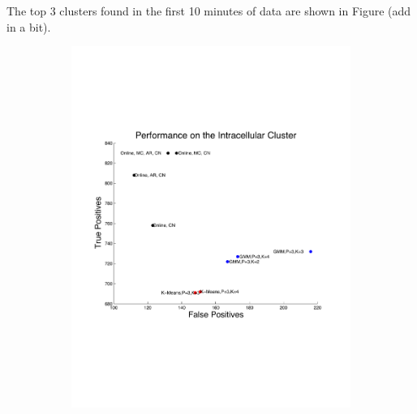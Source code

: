 \documentclass{article} %
\begin{document}
 The top 3 clusters found in the first 10 minutes of data are shown in Figure (add in a bit).


\begin{center}
\begin{figure}
\begin{subfigure}[b]{.5\textwidth}
\centering
\includegraphics[width=\textwidth]{../figs/truefalsepositive}
\caption{}
\label{hc1res}
\end{subfigure}
\begin{subfigure}[b]{.5\textwidth}

\end{subfigure}
\end{figure}
\end{center}
\end{document}
